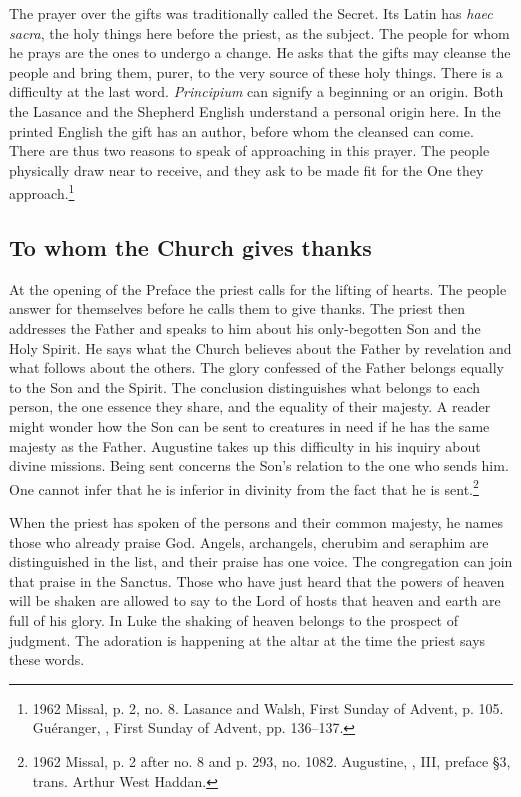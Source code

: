 The prayer over the gifts was traditionally called the Secret. Its Latin has \emph{haec sacra}, the holy things here before the priest, as the subject. The people for whom he prays are the ones to undergo a change. He asks that the gifts may cleanse the people and bring them, purer, to the very source of these holy things. There is a difficulty at the last word. \emph{Principium} can signify a beginning or an origin. Both the Lasance and the Shepherd English understand a personal origin here. In the printed English the gift has an author, before whom the cleansed can come. There are thus two reasons to speak of approaching in this prayer. The people physically draw near to receive, and they ask to be made fit for the One they approach.\footnote{1962 Missal, p. 2, no. 8. Lasance and Walsh, First Sunday of Advent, p. 105. Guéranger, , First Sunday of Advent, pp. 136--137.}

\subsection{To whom the Church gives thanks}

At the opening of the Preface the priest calls for the lifting of hearts. The people answer for themselves before he calls them to give thanks. The priest then addresses the Father and speaks to him about his only-begotten Son and the Holy Spirit. He says what the Church believes about the Father by revelation and what follows about the others. The glory confessed of the Father belongs equally to the Son and the Spirit. The conclusion distinguishes what belongs to each person, the one essence they share, and the equality of their majesty. A reader might wonder how the Son can be sent to creatures in need if he has the same majesty as the Father. Augustine takes up this difficulty in his inquiry about divine missions. Being sent concerns the Son's relation to the one who sends him. One cannot infer that he is inferior in divinity from the fact that he is sent.\footnote{1962 Missal, p. 2 after no. 8 and p. 293, no. 1082. Augustine, , III, preface §3, trans. Arthur West Haddan.}

When the priest has spoken of the persons and their common majesty, he names those who already praise God. Angels, archangels, cherubim and seraphim are distinguished in the list, and their praise has one voice. The congregation can join that praise in the Sanctus. Those who have just heard that the powers of heaven will be shaken are allowed to say to the Lord of hosts that heaven and earth are full of his glory. In Luke the shaking of heaven belongs to the prospect of judgment. The adoration is happening at the altar at the time the priest says these words.

